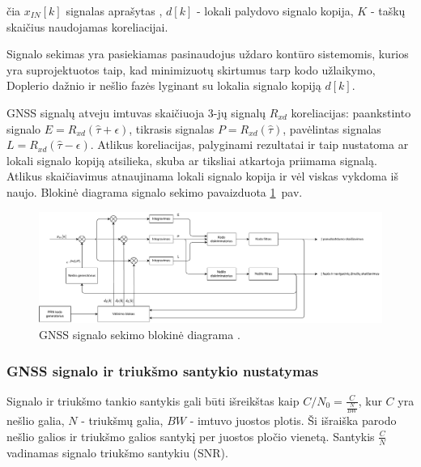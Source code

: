 \documentclass[main.tex]{subfiles}
\begin{document}
\noindent čia $x_{IN}[k]$ signalas aprašytas , $d[k]$ - lokali palydovo
signalo kopija, $K$ - taškų skaičius naudojamas koreliacijai.

Signalo sekimas yra pasiekiamas pasinaudojus uždaro kontūro sistemomis,
kurios yra su\-pro\-jek\-tuo\-tos taip, kad minimizuotų skirtumus tarp kodo užlaikymo,
Doplerio dažnio ir nešlio fazės lyginant su lokalia signalo kopiją $d[k]$.

GNSS signalų atveju imtuvas skaičiuoja 3-jų signalų $R_{xd}$ koreliacijas:
paankstinto signalo $E=R_{xd}(\hat{\tau} + \epsilon)$,
tikrasis signalas $P=R_{xd}(\hat{\tau})$,
pavėlintas signalas $L=R_{xd}(\hat{\tau} - \epsilon)$.
Atlikus koreliacijas, palyginami rezultatai ir taip nustatoma
ar lokali signalo kopiją atsilieka, skuba ar tiksliai atkartoja
priimama signalą. Atlikus skaičiavimus atnaujinama lokali signalo kopija
ir vėl viskas vykdoma iš naujo. Blokinė diagrama signalo sekimo pavaizduota
\ref{fig:gnss_sdr_tracking_block}~pav.

\begin{figure}[h]
    \begin{centering}
    \includegraphics[scale=0.5]{drawings/tracking_diagram}
    \par\end{centering}
    \protect\caption{\label{fig:gnss_sdr_tracking_block}GNSS signalo sekimo blokinė diagrama \cite{gnss_sdr_web}.}
\end{figure}

\subsubsection{GNSS signalo ir triukšmo santykio nustatymas}\label{sec:gnss_snr}

Signalo ir triukšmo tankio santykis gali būti išreikštas kaip $C/N_0 = \frac{C}{\frac{N}{BW}}$,
kur $C$ yra nešlio galia, $N$ - triukšmų galia, $BW$ - imtuvo juostos plotis.
Ši išraiška parodo nešlio galios ir triukšmo galios santykį per juostos pločio vienetą.
Santykis $\frac{C}{N}$ vadinamas signalo triukšmo santykiu (SNR).
\end{document}
